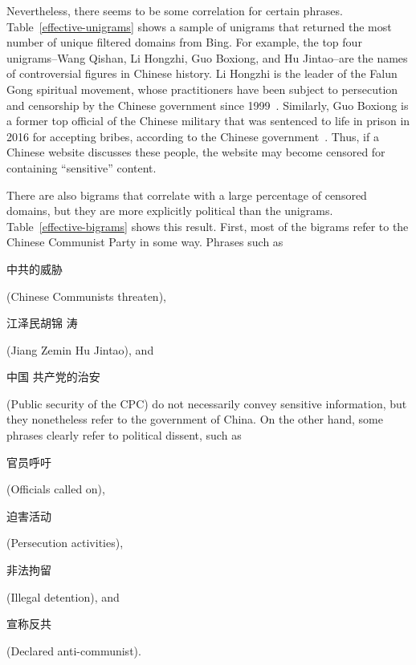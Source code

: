 Nevertheless, there seems to be some correlation for certain
phrases. Table~\ref{effective-unigrams} shows a sample of unigrams
that returned the most number of unique filtered domains from
Bing. For example, the top four unigrams--Wang Qishan, Li Hongzhi, Guo
Boxiong, and Hu Jintao--are the names of controversial figures in
Chinese history. Li Hongzhi is the leader of the Falun Gong spiritual
movement, whose practitioners have been subject to persecution and
censorship by the Chinese government since
1999~\cite{freedomhouse:falun}. Similarly, Guo Boxiong is a former top
official of the Chinese military that was sentenced to life in
prison in 2016 for accepting bribes, according to the Chinese
government~\cite{guardian:guo}. Thus, if a Chinese website discusses
these people, the website may become censored for containing
``sensitive'' content.

There are also bigrams that correlate with a large percentage of
censored domains, but they are more explicitly political than the
unigrams. Table~\ref{effective-bigrams} shows this result. First, most
of the bigrams refer to the Chinese Communist Party in some
way. Phrases such as \begin{CJK*}{UTF8}{gbsn}中共的威胁\end{CJK*}
(Chinese Communists threaten), \begin{CJK*}{UTF8}{gbsn}江泽民胡锦
涛\end{CJK*} (Jiang Zemin Hu Jintao), and \begin{CJK*}{UTF8}{gbsn}中国
共产党的治安\end{CJK*} (Public security of the CPC) do not necessarily
convey sensitive information, but they nonetheless refer to the
government of China. On the other hand, some phrases clearly refer to
political dissent, such as \begin{CJK*}{UTF8}{gbsn}官员呼吁\end{CJK*}
(Officials called on), \begin{CJK*}{UTF8}{gbsn}迫害活动\end{CJK*}
(Persecution activities), \begin{CJK*}{UTF8}{gbsn}非法拘留\end{CJK*}
(Illegal detention), and \begin{CJK*}{UTF8}{gbsn}宣称反共\end{CJK*}
(Declared anti-communist).

